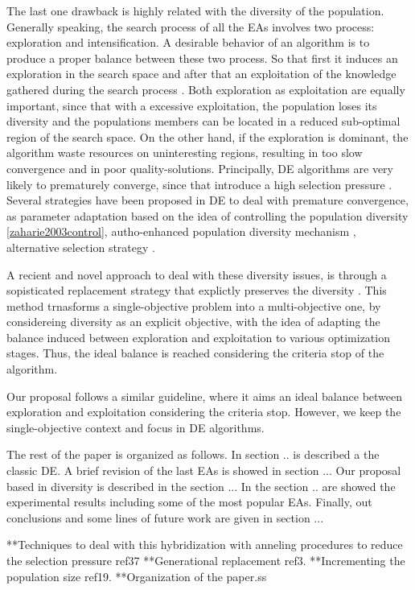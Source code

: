 %
The last one drawback is highly related with the diversity of the population.
%
Generally speaking, the search process of all the EAs involves two process: exploration and intensification.
%
A desirable behavior of an algorithm is to produce a proper balance between these two process.
%
So that first it induces an exploration in the search space and after that an exploitation of the knowledge gathered during the search process \cite{zaharie2003control}.
%
Both exploration as exploitation are equally important, since that with a excessive exploitation, the population loses its diversity and the populations members can be located in a reduced sub-optimal region of the search space.
%
On the other hand, if the exploration is dominant, the algorithm waste resources on uninteresting regions, resulting in too slow convergence and in poor quality-solutions.
%
Principally, DE algorithms are very likely to prematurely converge, since that introduce a high selection pressure \cite{sa2008exploration}.
%
Several strategies have been proposed in DE to deal with premature convergence, as parameter adaptation based on the idea of controlling the population diversity \ref{zaharie2003control}, autho-enhanced population diversity mechanism \cite{yang2015differential}, alternative selection strategy \cite{sa2008exploration}.


A recient and novel approach to deal with these diversity issues, is through a sopisticated replacement strategy that explictly preserves the diversity \cite{segura2016novel}.
%
This method trnasforms a single-objective problem into a multi-objective one, by considereing diversity as an explicit objective, with the idea of adapting the balance induced between exploration and exploitation to various optimization stages.
%
Thus, the ideal balance is reached considering the criteria stop of the algorithm.
%

Our proposal follows a similar guideline, where it aims an ideal balance between exploration and exploitation considering the criteria stop.
%
However, we keep the single-objective context and focus in DE algorithms.



The rest of the paper is organized as follows.
%
In section .. is described a the classic DE.
%
A brief revision of the last EAs is showed in section ...
%
Our proposal based in diversity is described in the section ...
%
In the section .. are showed the experimental results including some of the most popular EAs.
%
Finally, out conclusions and some lines of future work are given in section ...

   **Techniques to deal with this hybridization with anneling procedures to reduce the selection pressure ref37
   **Generational replacement ref3.
   **Incrementing the population size ref19.
**Organization of the paper.ss
